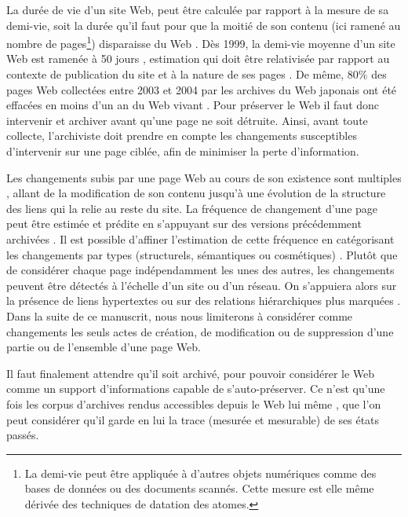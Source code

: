 \documentclass[symmetric,justified,marginals=raggedouter]{tufte-book}
\begin{document}
La durée de vie d'un site Web, peut être calculée par rapport à la mesure de sa demi-vie, soit la durée qu'il faut pour que la moitié de son contenu (ici ramené au nombre de pages\footnote{\RaggedOuter La demi-vie peut être appliquée à d'autres objets numériques comme des bases de données ou des documents scannés. Cette mesure est elle même dérivée des techniques de datation des atomes.}) disparaisse du Web \citep{koehler_longitudinal_2004}. Dès 1999, la demi-vie moyenne d'un site Web est ramenée à 50 jours \citep{cho_evolution_1999}, estimation qui doit être relativisée par rapport au contexte de publication du site et à la nature de ses pages \citep{mcdonnell_cataloging_1999,fetterly_large-scale_2003}. De même, 80\% des pages Web collectées entre 2003 et 2004 par les archives du Web japonais ont été effacées en moins d'un an du Web vivant \citep{toyoda_whats_2006}. Pour préserver le Web il faut donc intervenir et archiver avant qu'une page ne soit détruite. Ainsi, avant toute collecte, l'archiviste doit prendre en compte les changements susceptibles d'intervenir sur une page ciblée, afin de minimiser la perte d'information.

Les changements subis par une page Web au cours de son existence sont multiples \citep{douglis_at&t_1998, adar_web_2009}, allant de la modification de son contenu jusqu'à une évolution de la structure des liens qui la relie au reste du site. La fréquence de changement d'une page peut être estimée et prédite en s'appuyant sur des versions précédemment archivées \citep{chawathe_meaningful_1997,khoury_efficient_2007}. Il est possible d'affiner l'estimation de cette fréquence en catégorisant les changements par types (structurels, sémantiques ou cosmétiques) \citep{yadav_change_2007}. Plutôt que de considérer chaque page indépendamment les unes des autres, les changements peuvent être détectés à l'échelle d'un site ou d'un réseau. On s'appuiera alors sur la présence de liens hypertextes \citep{liu_webcq-detecting_2000} ou sur des relations hiérarchiques plus marquées \citep{lim_automated_2001}. Dans la suite de ce manuscrit, nous nous limiterons à considérer comme changements les seuls actes de création, de modification ou de suppression d'une partie ou de l'ensemble d'une page Web.

Il faut finalement attendre qu'il soit archivé, pour pouvoir considérer le Web comme un support d'informations capable de s'auto-préserver. Ce n'est qu'une fois les corpus d'archives rendus accessibles depuis le Web lui même \citep{brugger_website_2009}, que l'on peut considérer qu'il garde en lui la trace (mesurée et mesurable) de ses états passés.\\
\end{document}
